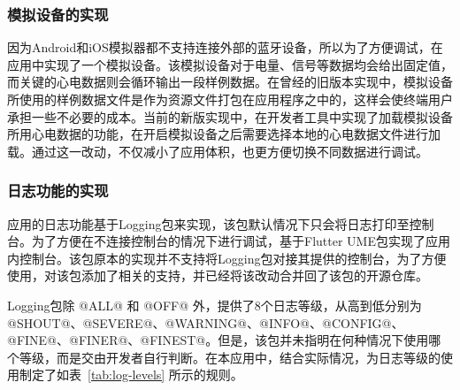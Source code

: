 \subsubsection{模拟设备的实现}

因为Android和iOS模拟器都不支持连接外部的蓝牙设备，所以为了方便调试，在应用中实现了一个模拟设备。该模拟设备对于电量、信号等数据均会给出固定值，而关键的心电数据则会循环输出一段样例数据。在曾经的旧版本实现中，模拟设备所使用的样例数据文件是作为资源文件打包在应用程序之中的，这样会使终端用户承担一些不必要的成本。当前的新版实现中，在开发者工具中实现了加载模拟设备所用心电数据的功能，在开启模拟设备之后需要选择本地的心电数据文件进行加载。通过这一改动，不仅减小了应用体积，也更方便切换不同数据进行调试。

\subsubsection{日志功能的实现}

应用的日志功能基于Logging包来实现，该包默认情况下只会将日志打印至控制台。为了方便在不连接控制台的情况下进行调试，基于Flutter UME包实现了应用内控制台。该包原本的实现并不支持将Logging包对接其提供的控制台，为了方便使用，对该包添加了相关的支持，并已经将该改动合并回了该包的开源仓库。

Logging包除 @ALL@ 和 @OFF@ 外，提供了8个日志等级，从高到低分别为 @SHOUT@、@SEVERE@、@WARNING@、@INFO@、@CONFIG@、@FINE@、@FINER@、@FINEST@。但是，该包并未指明在何种情况下使用哪个等级，而是交由开发者自行判断。在本应用中，结合实际情况，为日志等级的使用制定了如表~\ref{tab:log-levels} 所示的规则。


